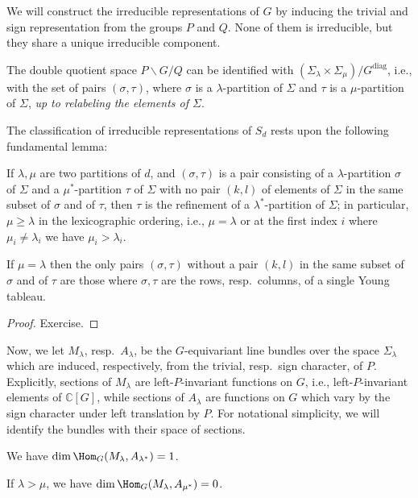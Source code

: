 We will construct the irreducible representations of $G$ by inducing the trivial and sign representation from the groups $P$ and $Q$. None of them is irreducible, but they share a unique irreducible component.





The double quotient space $P\backslash G/Q$ can be identified with $(\Sigma_\lambda \times \Sigma_\mu)/G^{\text{diag}}$, i.e., with the set of pairs
$(\sigma,\tau)$, where $\sigma$ is a $\lambda$-partition of $\Sigma$ and $\tau$ is a $\mu$-partition of $\Sigma$, \emph{up to relabeling the elements of $\Sigma$}.

The classification of irreducible representations of $S_d$ rests upon the following fundamental lemma:

\begin{lemma}
\label{lemma-combinatorics}
 If $\lambda, \mu$ are two partitions of $d$, and $(\sigma,\tau)$ is a pair consisting of a $\lambda$-partition $\sigma$ of $\Sigma$ and a $\mu^*$-partition $\tau$ of $\Sigma$ with no pair $(k,l)$ of elements of $\Sigma$ in the same subset of $\sigma$ and of $\tau$, then $\tau$ is the refinement of a $\lambda^*$-partition of $\Sigma$; in particular, $\mu \ge \lambda$ in the lexicographic ordering, i.e., $\mu=\lambda$ or at the first index $i$ where $\mu_i\ne \lambda_i$ we have $\mu_i > \lambda_i$.
 
 If $\mu=\lambda$ then the only pairs $(\sigma,\tau)$ without a pair $(k,l)$ in the same subset of $\sigma$ and of $\tau$ are those where $\sigma, \tau$ are the rows, resp.\ columns, of a single Young tableau.
\end{lemma}


\begin{proof}
 Exercise.
\end{proof}

Now, we let $M_\lambda$, resp.\ $A_\lambda$, be the $G$-equivariant line bundles over the space $\Sigma_\lambda$ which are induced, respectively, from the trivial, resp.\ sign character, of $P$. Explicitly, sections of $M_\lambda$ are left-$P$-invariant functions on $G$, i.e., left-$P$-invariant elements of $\mathbb C[G]$, while sections of $A_\lambda$ are functions on $G$ which vary by the sign character under left translation by $P$. For notational simplicity, we will identify the bundles with their space of sections.

\begin{proposition}
 \label{proposition-intertwiners}
We have $\dim\Hom_G(M_\lambda, A_{\lambda^*}) = 1$. 

If $\lambda>\mu$, we have $\dim\Hom_G(M_\lambda, A_{\mu^*}) = 0$.
\end{proposition}

